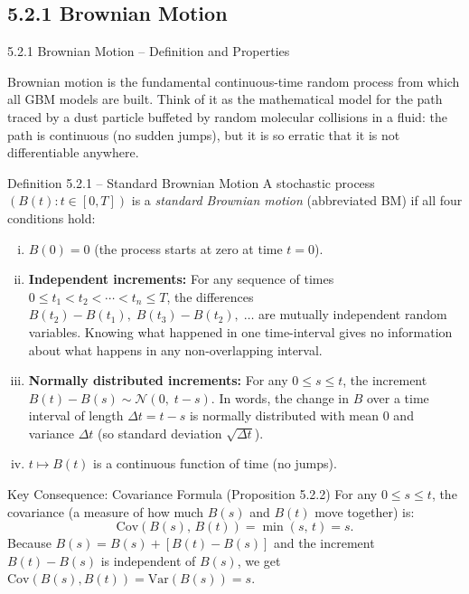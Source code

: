 \documentclass[aspectratio=169,10pt]{beamer}
\begin{document}
\subsection{5.2.1 Brownian Motion}

\begin{frame}[allowframebreaks]{5.2.1 Brownian Motion -- Definition and Properties}

Brownian motion is the fundamental continuous-time random process from which all
GBM models are built.  Think of it as the mathematical model for the path traced
by a dust particle buffeted by random molecular collisions in a fluid: the path is
continuous (no sudden jumps), but it is so erratic that it is not differentiable
anywhere.

\begin{block}{Definition 5.2.1 -- Standard Brownian Motion}
  A stochastic process $(B(t) : t \in [0, T])$ is a \emph{standard Brownian
  motion} (abbreviated BM) if all four conditions hold:
  \begin{enumerate}[(i)]
    \item $B(0) = 0$ (the process starts at zero at time $t = 0$).
    \item \textbf{Independent increments:} For any sequence of times
          $0 \le t_1 < t_2 < \cdots < t_n \le T$, the differences
          $B(t_2) - B(t_1),\; B(t_3) - B(t_2),\; \ldots$ are mutually independent
          random variables.  Knowing what happened in one time-interval gives no
          information about what happens in any non-overlapping interval.
    \item \textbf{Normally distributed increments:} For any $0 \le s \le t$,
          the increment $B(t) - B(s) \sim \mathcal{N}(0,\; t - s)$.  In words,
          the change in $B$ over a time interval of length $\Delta t = t - s$ is
          normally distributed with mean $0$ and variance $\Delta t$ (so standard
          deviation $\sqrt{\Delta t}$).
    \item $t \mapsto B(t)$ is a continuous function of time (no jumps).
  \end{enumerate}
\end{block}

\framebreak

\begin{block}{Key Consequence: Covariance Formula (Proposition 5.2.2)}
  For any $0 \le s \le t$, the covariance (a measure of how much $B(s)$ and
  $B(t)$ move together) is:
  \[
    \mathrm{Cov}(B(s),\, B(t)) = \min(s,\, t) = s.
  \]
  Because $B(s) = B(s) + [B(t)-B(s)]$ and the increment $B(t)-B(s)$ is
  independent of $B(s)$, we get $\mathrm{Cov}(B(s), B(t)) = \mathrm{Var}(B(s)) = s$.


\end{block}
\end{frame}
\end{document}
